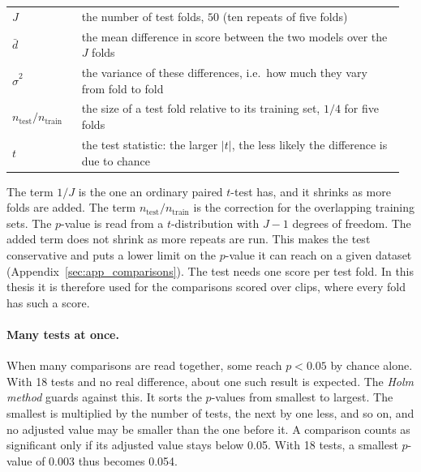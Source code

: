\smallskip
\noindent\begin{tabular}{@{}p{0.17\linewidth}p{0.79\linewidth}@{}}
  $J$ & the number of test folds, $50$ (ten repeats of five folds) \\
  $\bar{d}$ & the mean difference in score between the two models over the $J$ folds \\
  $\hat{\sigma}^2$ & the variance of these differences, i.e.\ how much they vary from fold to fold \\
  $n_\text{test}/n_\text{train}$ & the size of a test fold relative to its training set, $1/4$ for five folds \\
  $t$ & the test statistic: the larger $|t|$, the less likely the difference is due to chance \\
\end{tabular}
\smallskip

\noindent The term $1/J$ is the one an ordinary paired $t$-test has, and it shrinks as more folds are added. The term $n_\text{test}/n_\text{train}$ is the correction for the overlapping training sets. The $p$-value is read from a $t$-distribution with $J-1$ degrees of freedom. The added term does not shrink as more repeats are run. This makes the test conservative and puts a lower limit on the $p$-value it can reach on a given dataset (Appendix~\ref{sec:app_comparisons}). The test needs one score per test fold. In this thesis it is therefore used for the comparisons scored over clips, where every fold has such a score.

\paragraph{Many tests at once.} When many comparisons are read together, some reach $p<0.05$ by chance alone. With 18 tests and no real difference, about one such result is expected. The \emph{Holm method} \citep{holm1979simple} guards against this. It sorts the $p$-values from smallest to largest. The smallest is multiplied by the number of tests, the next by one less, and so on, and no adjusted value may be smaller than the one before it. A comparison counts as significant only if its adjusted value stays below 0.05. With 18 tests, a smallest $p$-value of 0.003 thus becomes 0.054.
